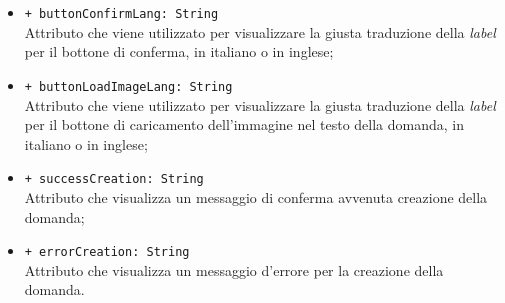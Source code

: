 \begin{itemize}
\begin{itemize}
		\item \texttt{+ buttonConfirmLang: String} \\ Attributo che viene utilizzato per visualizzare la giusta traduzione della \textit{label} per il bottone di conferma, in italiano o in inglese;
		\item \texttt{+ buttonLoadImageLang: String} \\ Attributo che viene utilizzato per visualizzare la giusta traduzione della \textit{label} per il bottone di caricamento dell'immagine nel testo della domanda, in italiano o in inglese;
		\item \texttt{+ successCreation: String} \\ Attributo che visualizza un messaggio di conferma avvenuta creazione della domanda;
		\item \texttt{+ errorCreation: String} \\ Attributo che visualizza un messaggio d'errore per la creazione della domanda.
	\end{itemize}
\end{itemize}


